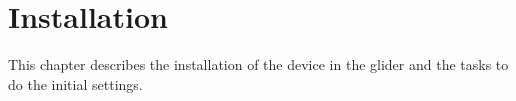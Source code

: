 \chapter{Installation}\label{cha:installation}

This chapter describes the installation of the device in the glider and the tasks to do the initial settings.